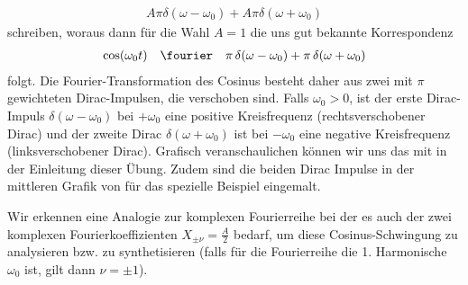 \begin{mdframed}
\begin{align}
A \pi \delta(\omega-\omega_0) + A \pi \delta(\omega+\omega_0)
\end{align}
schreiben, woraus dann für die Wahl $A=1$ die uns gut bekannte Korrespondenz
\begin{align}
\cos(\omega_0 t) \quad\fourier\quad \pi \, \delta(\omega-\omega_0) + \pi \, \delta(\omega+\omega_0)
\end{align}
folgt.
%
Die Fourier-Transformation des Cosinus besteht daher aus zwei mit $\pi$ gewichteten
Dirac-Impulsen, die verschoben sind. Falls $\omega_0>0$, ist der erste
Dirac-Impuls $\delta(\omega-\omega_0)$ bei $+\omega_0$ eine positive Kreisfrequenz
(rechtsverschobener Dirac)
und der zweite Dirac $\delta(\omega+\omega_0)$ ist bei $-\omega_0$ eine
negative Kreisfrequenz (linksverschobener Dirac).
%
Grafisch veranschaulichen können wir uns das mit 
in der Einleitung dieser Übung.
%
Zudem sind die beiden Dirac Impulse in der mittleren Grafik von
 für das spezielle Beispiel eingemalt.
%

Wir erkennen eine Analogie zur komplexen Fourierreihe bei der es auch der
zwei komplexen Fourierkoeffizienten $X_{\pm \nu} = \frac{A}{2}$ bedarf, um diese
Cosinus-Schwingung zu analysieren bzw. zu synthetisieren (falls für die
Fourierreihe die 1. Harmonische $\omega_0$ ist, gilt dann $\nu=\pm 1$).
\end{mdframed}



